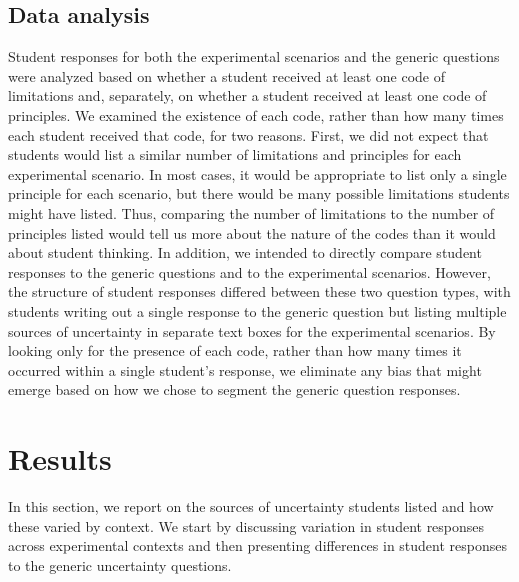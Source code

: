 \documentclass[english,aps,prstper,reprint,showpacs,longbibliography,superscriptaddress,nofootinbib]{revtex4-2}
\begin{document}
\subsection{Data analysis}

Student responses for both the experimental scenarios and the generic questions were analyzed based on whether a student received at least one code of limitations and, separately, on whether a student received at least one code of principles. We examined the existence of each code, rather than how many times each student received that code, for two reasons. First, we did not expect that students would list a similar number of limitations and principles for each experimental scenario. In most cases, it would be appropriate to list only a single principle for each scenario, but there would be many possible limitations students might have listed. Thus, comparing the number of limitations to the number of principles listed would tell us more about the nature of the codes than it would about student thinking. In addition, we intended to directly compare student responses to the generic questions and to the experimental scenarios. However, the structure of student responses differed between these two question types, with students writing out a single response to the generic question but listing multiple sources of uncertainty in separate text boxes for the experimental scenarios. By looking only for the presence of each code, rather than how many times it occurred within a single student's response, we eliminate any bias that might emerge based on how we chose to segment the generic question responses.



\section{Results}

In this section, we report on the sources of uncertainty students listed and how these varied by context. We start by discussing variation in student responses across experimental contexts and then presenting differences in student responses to the generic uncertainty questions.
\end{document}
